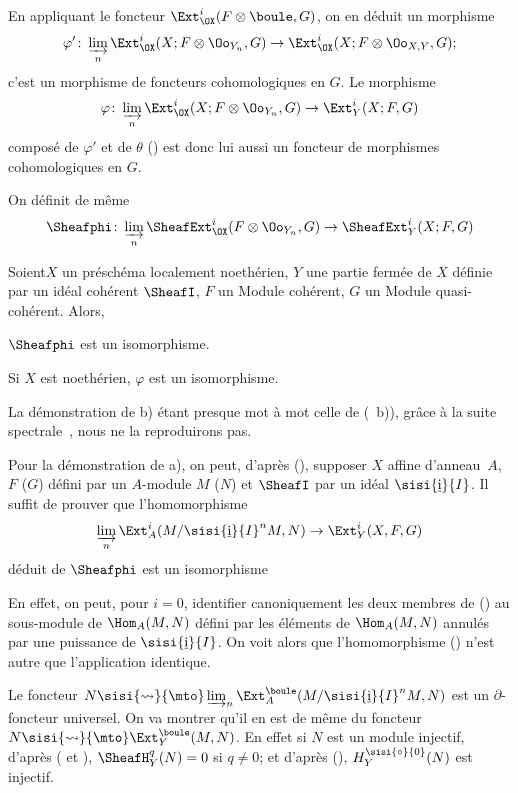 En appliquant le foncteur $\Ext_{\OX}^i(F\otimes\boule, G)$, on en d\'eduit un morphisme
$$
\varphi'\colon \varinjlim_{n} \Ext_{\OX}^i(X;F\otimes \Oo_{Y_n}, G) \to \Ext_{\OX}^i(X;F \otimes \Oo_{X, Y}, G);
$$
c'est un morphisme de foncteurs cohomologiques en $G$. Le morphisme
$$
\varphi\colon \varinjlim_{n} \Ext_{\OX}^i(X;F\otimes \Oo_{Y_n}, G) \to \Ext_Y^i(X;F, G)
$$
compos\'e de $\varphi'$ et de $\theta$ (\cf {}) est donc lui aussi un foncteur de morphismes cohomologiques en $G$.

On d\'efinit de m\^eme
$$
\Sheafphi\colon \varinjlim_n \SheafExt_{\OX}^i(F \otimes \Oo_{Y_n}, G) \to \SheafExt_Y^i(X;F, G)
$$

\begin{theoreme} \label{VI.2.3}
Soient\pageoriginale $X$ un pr\'esch\'ema localement noeth\'erien, $Y$ une partie ferm\'ee de $X$ d\'efinie par un id\'eal coh\'erent $\SheafI$, $F$ un Module coh\'erent, $G$ un Module quasi-coh\'erent. Alors,
\begin{enumeratea}
\item
$\Sheafphi$ est un isomorphisme.
\item
Si $X$ est noeth\'erien, $\varphi$ est un isomorphisme.
\end{enumeratea}
\end{theoreme}

La d\'emonstration de b) \'etant presque mot \`a mot celle de (\sisi{,}{}~\sisi{,~}{}b)), gr\^ace \`a la suite spectrale~, nous ne la reproduirons pas.

Pour la d\'emonstration de a), on peut, d'apr\`es (), supposer $X$ affine d'anneau~$A$, $F$ (\resp $G$) d\'efini par un $A$-module $M$ (\resp $N$) et $\SheafI$ par un id\'eal $\sisi{\underline{\rm{i}}}{I}$. Il suffit de prouver que l'homomorphisme
\begin{equation} \label{VI.2.3.1} \varinjlim_{{n}} \Ext_A^i(M/\sisi{\underline{\rm{i}}}{I}^nM, N) \to \Ext_Y^i(X, F, G)
\end{equation}
d\'eduit de $\Sheafphi$ est un isomorphisme

En effet, on peut, pour $i=0$, identifier canoniquement les deux membres de () au sous-module de $\Hom_A(M, N)$ d\'efini par les \'el\'ements de $\Hom_A(M, N)$ annul\'es par une puissance de $\sisi{\underline{\rm{i}}}{I}$. On voit alors que l'homomorphisme () n'est autre que l'application identique.

Le foncteur $N\sisi{\rightsquigarrow}{\mto} \varinjlim_{n} \Ext_A^\boule(M/\sisi{\underline{\rm{i}}}{I}^nM, N)$ est un $\partial$-foncteur universel. On va montrer qu'il en est de m\^eme du foncteur $N \sisi{\rightsquigarrow}{\mto} \Ext_Y^\boule(M, N)$. En effet si $N$ est un module injectif, d'apr\`es ( et ), $\SheafH_Y^q(N)=0$ si $q \neq 0$; et d'apr\`es (), $H_Y^{\sisi{\circ}{0}}(N)$ est injectif.

